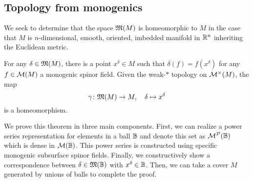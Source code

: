 \subsection{Topology from monogenics}

We seek to determine that the space $\mathfrak{M}(M)$ is homeomorphic to $M$ in the case that $M$ is $n$-dimensional, smooth, oriented, imbedded manifold in $\mathbb{R}^n$ inheriting the Euclidean metric. 

\begin{theorem}
\label{thm:gelfand}
For any $\delta \in \mathfrak{M}(M)$, there is a point $x^\delta \in M$ such that $\delta(f) = f(x^\delta)$ for any $f\in \mathcal{M}(M)$ a monogenic spinor field. Given the weak-$\ast$ topology on $\mathcal{M}^\times(M)$, the map
\[
\gamma \colon \mathfrak{M}(M) \to M, \quad \delta \mapsto x^\delta
\]
is a homeomorphism. 
\end{theorem}

We prove this theorem in three main components. First, we can realize a power series representation for elements in a ball $\mathbb{B}$ and denote this set as $\mathcal{M}^\mathcal{P}(\mathbb{B})$ which is dense in $\mathcal{M}(\mathbb{B})$. This power series is constructed using specific monogenic subsurface spinor fields. Finally, we constructively show a correspondence between $\delta \in \mathfrak{M}(\mathbb{B})$ with $x^\delta \in \mathbb{B}$. Then, we can take a cover $M$ generated by unions of balls to complete the proof.

